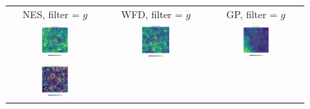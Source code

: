 \documentclass[preprintm,linenumbers]{aastex631}
\begin{document}
  	\begin{figure}
			\centering
			\begin{tabular}{  c c c}
                 NES, filter = $g$ & WFD, filter = $g$ & GP, filter = $g$ \\
				\includegraphics[width=0.3\textwidth]{results/skymaps_cutout/skymaps_cutout_first_year_one_snap_v4_0_10yrs_db_noDD_noTwi_nside-256_CountMetric_g_NES_noDD_noTwi.pdf} &
				\includegraphics[width=0.3\textwidth]{results/skymaps_cutout/skymaps_cutout_first_year_one_snap_v4_0_10yrs_db_noDD_noTwi_nside-256_CountMetric_g_WFD_noDD_noTwi.pdf} &
				\includegraphics[width=0.3\textwidth]{results/skymaps_cutout/skymaps_cutout_first_year_one_snap_v4_0_10yrs_db_noDD_noTwi_nside-256_CountMetric_g_GP_noDD_noTwi.pdf} \\
				\includegraphics[width=0.3\textwidth]{results/skymaps_cutout/skymaps_cutout_first_year_one_snap_v4_0_10yrs_db_noDD_noTwi_tscale-3_nside-256_doAllTemplateMetrics_reduceCount_g_NES_noDD_noTwi.pdf} &

\end{tabular}
\end{figure}
\end{document}
